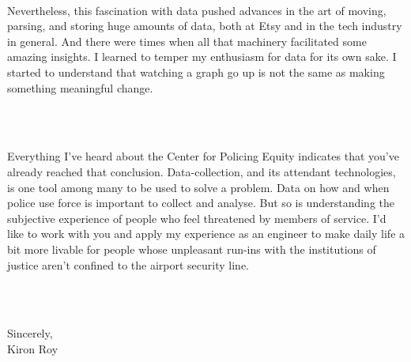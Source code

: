 \documentclass[9pt]{developercv} %
\begin{document}
\vspace{0.25cm}\\
\parbox{1\textwidth}{\hspace{0.75cm}Nevertheless, this fascination with data pushed advances in the art of moving, parsing, and storing huge amounts of data, both at Etsy and in the tech industry in general. And there were times when all that machinery facilitated some amazing insights. I learned to temper my enthusiasm for data for its own sake. I started to understand that watching a graph go up is not the same as making something meaningful change.}\\
\vspace{0.25cm}\\
\parbox{1\textwidth}{\hspace{0.75cm}Everything I’ve heard about the Center for Policing Equity indicates that you’ve already reached that conclusion. Data-collection, and its attendant technologies, is one tool among many to be used to solve a problem. Data on how and when police use force is important to collect and analyse. But so is understanding the subjective experience of people who feel threatened by members of service. I’d like to work with you and apply my experience as an engineer to make daily life a bit more livable for people whose unpleasant run-ins with the institutions of justice aren’t confined to the airport security line.}\\
\vspace{0.5cm}\\

\parbox{1\textwidth}{Sincerely,\\Kiron Roy}
\end{document}
